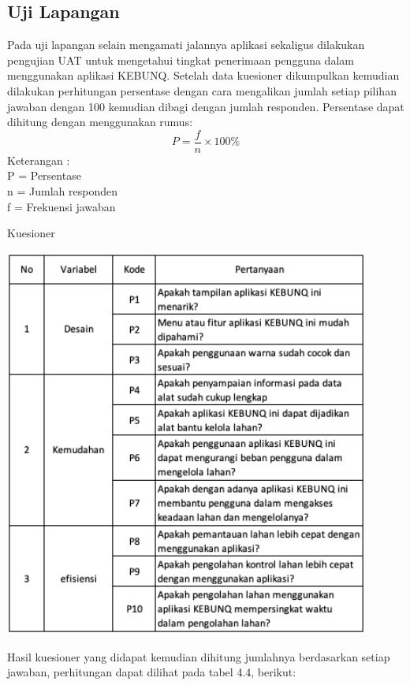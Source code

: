 \begin{flushleft}
\begin{justify}
        \subsection{Uji Lapangan}
        Pada uji lapangan selain mengamati jalannya aplikasi sekaligus dilakukan pengujian UAT untuk mengetahui tingkat penerimaan pengguna dalam menggunakan aplikasi KEBUNQ.
        Setelah data kuesioner dikumpulkan kemudian dilakukan perhitungan persentase dengan cara mengalikan jumlah setiap pilihan jawaban 
        dengan 100 kemudian dibagi dengan jumlah responden. Persentase dapat dihitung dengan menggunakan rumus:
        \begin{equation}
            P = \frac{f}{n} \times 100\%
         \end{equation}
         \noindent Keterangan :
         \\P = Persentase
         \\n = Jumlah responden
         \\f = Frekuensi jawaban\\
         \begin{table}[ht]
            \centering
            \caption{Kuesioner}
            \includegraphics[width=12cm]{images/bab 4/uat.png}\\
            \end{table}
       \newline \noindent Hasil kuesioner yang didapat kemudian dihitung jumlahnya berdasarkan setiap jawaban, perhitungan dapat dilihat pada tabel 4.4, berikut:\\

\end{justify}
\end{flushleft}
